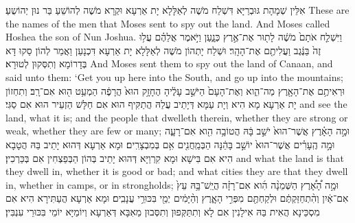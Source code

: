 {אִלֵּין שְׁמָהָת גּוּבְרַיָּא דִּשְׁלַח מֹשֶׁה לְאַלָּלָא יָת אַרְעָא וּקְרָא מֹשֶׁה לְהוֹשֵׁעַ בַּר נוּן יְהוֹשֻעַ׃}
{These are the names of the men that Moses sent to spy out the land. And Moses called Hoshea the son of Nun Joshua.}{}
{וַיִּשְׁלַ֤ח אֹתָם֙ מֹשֶׁ֔ה לָת֖וּר אֶת־אֶ֣רֶץ כְּנָ֑עַן וַיֹּ֣אמֶר אֲלֵהֶ֗ם עֲל֥וּ זֶה֙ בַּנֶּ֔גֶב וַעֲלִיתֶ֖ם אֶת־הָהָֽר׃
}
{וּשְׁלַח יָתְהוֹן מֹשֶׁה לְאַלָּלָא יָת אַרְעָא דִּכְנָעַן וַאֲמַר לְהוֹן סַקוּ דָּא בְּדָרוֹמָא וְתִסְּקוּן לְטוּרָא׃}
{And Moses sent them to spy out the land of Canaan, and said unto them: ‘Get you up here into the South, and go up into the mountains;}{}
{וּרְאִיתֶ֥ם אֶת־הָאָ֖רֶץ מַה־הִ֑וא וְאֶת־הָעָם֙ הַיֹּשֵׁ֣ב עָלֶ֔יהָ הֶחָזָ֥ק הוּא֙ הֲרָפֶ֔ה הַמְעַ֥ט ה֖וּא אִם־רָֽב׃
}
{וְתִחְזוֹן יָת אַרְעָא מָא הִיא וְיָת עַמָּא דְּיָתֵיב עֲלַהּ הֲתַקִּיף הוּא אִם חַלָּשׁ הַזְעֵיר הוּא אִם סַגִּי׃}
{and see the land, what it is; and the people that dwelleth therein, whether they are strong or weak, whether they are few or many;}{}
{וּמָ֣ה הָאָ֗רֶץ אֲשֶׁר־הוּא֙ יֹשֵׁ֣ב בָּ֔הּ הֲטוֹבָ֥ה הִ֖וא אִם־רָעָ֑ה וּמָ֣ה הֶֽעָרִ֗ים אֲשֶׁר־הוּא֙ יוֹשֵׁ֣ב בָּהֵ֔נָּה הַבְּמַֽחֲנִ֖ים אִ֥ם בְּמִבְצָרִֽים׃
}
{וּמָא אַרְעָא דְּהוּא יָתֵיב בַּהּ הֲטָבָא הִיא אִם בִּישָׁא וּמָא קִרְוַיָּא דְּהוּא יָתֵיב בְּהוֹן הַבְּפַצְחִין אִם בְּכַּרְכִין׃}
{and what the land is that they dwell in, whether it is good or bad; and what cities they are that they dwell in, whether in camps, or in strongholds;}{}
{וּמָ֣ה הָ֠אָ֠רֶץ הַשְּׁמֵנָ֨ה הִ֜וא אִם־רָזָ֗ה הֲיֵֽשׁ־בָּ֥הּ עֵץ֙ אִם־אַ֔יִן וְהִ֨תְחַזַּקְתֶּ֔ם וּלְקַחְתֶּ֖ם מִפְּרִ֣י הָאָ֑רֶץ וְהַ֨יָּמִ֔ים יְמֵ֖י בִּכּוּרֵ֥י עֲנָבִֽים׃
}
{וּמָא אַרְעָא הֲעַתִּירָא הִיא אִם מִסְכֵּינָא הֲאִית בַּהּ אִילָנִין אִם לָא וְתִתַּקְּפוּן וְתִסְּבוּן מֵאִבָּא דְּאַרְעָא וְיוֹמַיָּא יוֹמֵי בִּכּוּרֵי עִנְבִּין׃}
